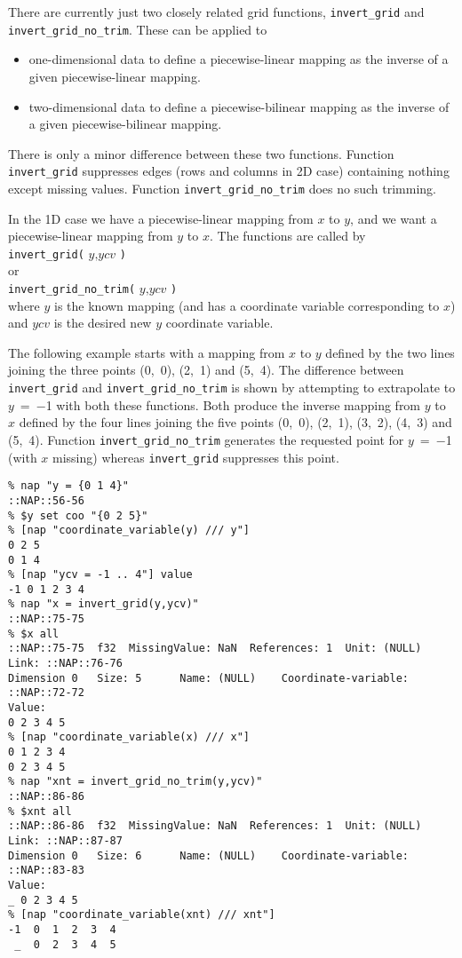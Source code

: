   \par There are currently just two closely related grid functions, 
  \texttt{invert\_grid} and 
  \texttt{invert\_grid\_no\_trim}. These can be applied to
  \begin{itemize}
    \item one-dimensional data to define a piecewise-linear mapping as
    the inverse of a given piecewise-linear mapping.
    \item two-dimensional data to define a piecewise-bilinear mapping as
    the inverse of a given piecewise-bilinear mapping.
  \end{itemize}
  \par There is only a minor difference between these two functions.
  Function 
  \texttt{invert\_grid} suppresses edges (rows and columns in 2D
  case) containing nothing except missing values. Function 
  \texttt{invert\_grid\_no\_trim} does no such trimming.
  \par In the 1D case we have a piecewise-linear mapping from 
  $x$ to 
  $y$, and we want a piecewise-linear mapping from 
  $y$ to 
  $x$. The functions are called by
  \\
  \texttt{invert\_grid(} 
  $y 
  \texttt{,}ycv$ 
  \texttt{)}
  \\or
  \\
  \texttt{invert\_grid\_no\_trim(} 
  $y 
  \texttt{,}ycv$ 
  \texttt{)}
  \\where 
  $y$ is the known mapping (and has a coordinate variable
  corresponding to 
  $x$)
  \\and 
  $ycv$ is the desired new 
  $y$ coordinate variable.
  \\
  \par The following example starts with a mapping from 
  $x$ to 
  $y$ defined by the two lines joining the three points
  (0,\ 0), (2,\ 1) and (5,\ 4). The difference between 
  \texttt{invert\_grid} and 
  \texttt{invert\_grid\_no\_trim} is shown by attempting to
  extrapolate to 
  $y$\ =\ $-$1 with both these functions. Both
  produce the inverse mapping from 
  $y$ to 
  $x$ defined by the four lines joining the five points
  (0,\ 0), (2,\ 1), (3,\ 2), (4,\ 3) and (5,\ 4).
  Function 
  \texttt{invert\_grid\_no\_trim} generates the requested point for 
  $y$\ =\ $-$1 (with 
  $x$ missing) whereas 
  \texttt{invert\_grid} suppresses this point.
  \begin{verbatim}
% nap "y = {0 1 4}"
::NAP::56-56
% $y set coo "{0 2 5}"
% [nap "coordinate_variable(y) /// y"]
0 2 5
0 1 4
% [nap "ycv = -1 .. 4"] value
-1 0 1 2 3 4
% nap "x = invert_grid(y,ycv)"
::NAP::75-75
% $x all
::NAP::75-75  f32  MissingValue: NaN  References: 1  Unit: (NULL)
Link: ::NAP::76-76
Dimension 0   Size: 5      Name: (NULL)    Coordinate-variable:
::NAP::72-72
Value:
0 2 3 4 5
% [nap "coordinate_variable(x) /// x"]
0 1 2 3 4
0 2 3 4 5
% nap "xnt = invert_grid_no_trim(y,ycv)"
::NAP::86-86
% $xnt all
::NAP::86-86  f32  MissingValue: NaN  References: 1  Unit: (NULL)
Link: ::NAP::87-87
Dimension 0   Size: 6      Name: (NULL)    Coordinate-variable:
::NAP::83-83
Value:
_ 0 2 3 4 5
% [nap "coordinate_variable(xnt) /// xnt"]
-1  0  1  2  3  4
 _  0  2  3  4  5
\end{verbatim}

